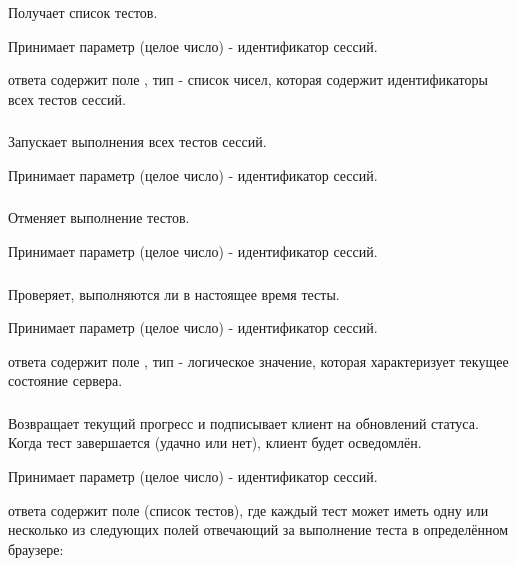 Получает список тестов.

Принимает параметр  (целое число) - идентификатор сессий.

 ответа содержит поле , тип - список чисел, которая содержит идентификаторы всех тестов сессий.

\subsubsection{}

Запускает выполнения всех тестов сессий.

Принимает параметр  (целое число) - идентификатор сессий.

\subsubsection{}

Отменяет выполнение тестов.

Принимает параметр  (целое число) - идентификатор сессий.

\subsubsection{}

Проверяет, выполняются ли в настоящее время тесты.

Принимает параметр  (целое число) - идентификатор сессий.

 ответа содержит поле , тип - логическое значение, которая характеризует текущее состояние сервера.

\subsubsection{}

Возвращает текущий прогресс и подписывает клиент на обновлений статуса. Когда тест завершается (удачно или нет), клиент будет осведомлён.

Принимает параметр  (целое число) - идентификатор сессий.

 ответа содержит поле  (список тестов), где каждый тест может иметь одну или несколько из следующих полей отвечающий за выполнение теста в определённом браузере:

